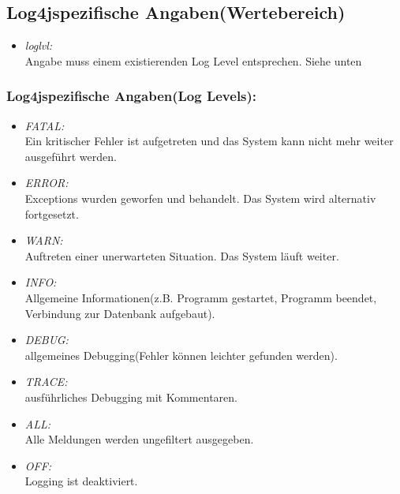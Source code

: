 \subsection{Log4jspezifische Angaben(Wertebereich)}

\begin{itemize}
	\item \emph{loglvl:}\\
	Angabe muss einem existierenden Log Level entsprechen. Siehe unten
\end{itemize}

\subsubsection{Log4jspezifische Angaben(Log Levels):}

\begin{itemize}
	\item \emph{FATAL:}\\
	Ein kritischer Fehler ist aufgetreten und das System kann nicht mehr weiter ausgeführt werden.
	\item \emph{ERROR:}\\
	Exceptions wurden geworfen und behandelt. Das System wird alternativ fortgesetzt.
	\item \emph{WARN:}\\
	Auftreten einer unerwarteten Situation. Das System läuft weiter.
	\item \emph{INFO:}\\
	Allgemeine Informationen(z.B. Programm gestartet, Programm beendet, Verbindung zur Datenbank aufgebaut).
	\item \emph{DEBUG:}\\
	allgemeines Debugging(Fehler können leichter gefunden werden).
	\item \emph{TRACE:}\\
	ausführliches Debugging mit Kommentaren.
	\item \emph{ALL:}\\
	Alle Meldungen werden ungefiltert ausgegeben.
	\item \emph{OFF:}\\
	Logging ist deaktiviert.
\end{itemize}


